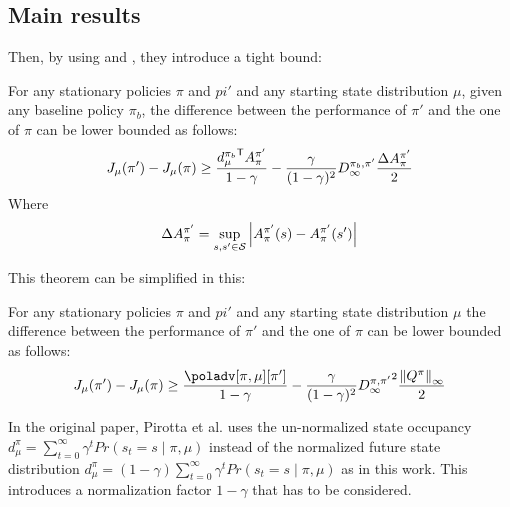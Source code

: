 \subsection{Main results}

Then, by using  and , they introduce a tight bound:

\begin{theorem}\label{th:pirotta-bound1}
For any stationary policies $\pi$ and $pi'$ and any starting state distribution $\mu$, given any baseline policy $\pi_b$, the difference between the performance of $\pi'$ and the one of $\pi$ can be lower bounded as follows:
\begin{equation}
J_{\mu}(\pi') - J_\mu(\pi) \geq \frac{{d_\mu^{\pi_b}}^{\mathsf{T}}A_\pi^{\pi'}}{1-\gamma} - \frac{\gamma}{(1-\gamma)^2}{D_\infty^{\pi_b, \pi'}} \frac{\Delta A_{\pi}^{\pi'}}{2}
\end{equation}
Where
\begin{equation}
\Delta A_{\pi}^{\pi'} = \sup_{s, s'\in\mathcal{S}}\left|{A_\pi^{\pi'}(s) - A_\pi^{\pi'}(s')}\right|
\end{equation}
\end{theorem}

This theorem can be simplified in this:

\begin{theorem}
For any stationary policies $\pi$ and $pi'$ and any starting state distribution $\mu$ the difference between the performance of $\pi'$ and the one of $\pi$ can be lower bounded as follows:
\begin{equation}
J_{\mu}(\pi') - J_\mu(\pi) \geq \frac{\poladv[\pi, \mu][\pi']}{1-\gamma} - \frac{\gamma}{(1-\gamma)^2}{D_\infty^{\pi, \pi'}}^2 \frac{\norm[\infty]{Q^\pi}}{2}
\end{equation}
\end{theorem}

\begin{note}
In the original paper, Pirotta et al. uses the un-normalized state occupancy $d_{\mu}^{\pi} = \sum_{t=0}^{\infty}\gamma^t Pr(s_t = s \mid \pi, \mu)$ instead of the normalized future state distribution $d_{\mu}^{\pi} = (1-\gamma)\sum_{t=0}^{\infty}\gamma^t Pr(s_t = s \mid \pi, \mu)$ as in this work. This introduces a normalization factor $1-\gamma$ that has to be considered.
\end{note}

